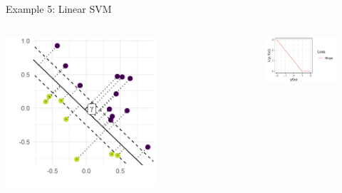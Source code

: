 \documentclass[11pt,compress,t,notes=noshow, xcolor=table]{beamer}
\begin{document}
\begin{vbframe}{Example 5: Linear SVM}
\begin{columns}[T] %
	\begin{column}{.5\textwidth}
		\begin{center}
			\includegraphics[width=0.7\textwidth]{figure_man/svm_geometry.png} 
		\end{center}
	\end{column} 
	\begin{column}{.5\textwidth}
	\begin{figure}
	\begin{center}
	\vspace*{0.5cm}
		\includegraphics[width=1\textwidth]{figure_man/hinge.pdf}
	\end{center}
		\end{figure}
	\end{column}
\end{columns}
\end{vbframe}
\end{document}
